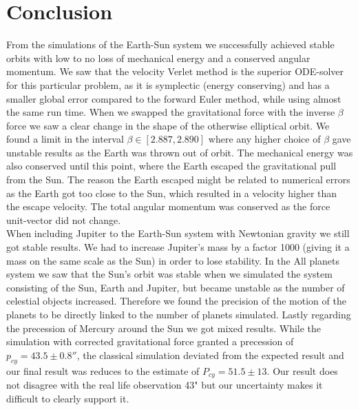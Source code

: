 \documentclass[american,a4paper,12pt]{article}
\begin{document}
\section{Conclusion}
From the simulations of the Earth-Sun system we successfully achieved stable orbits with low to no loss of mechanical energy and a conserved angular momentum. We saw that the velocity Verlet method is the superior ODE-solver for this particular problem, as it is symplectic (energy conserving) and has a smaller global error compared to the forward Euler method, while using almost the same run time. When we swapped the gravitational force with the inverse $\beta$ force we saw a clear change in the shape of the otherwise elliptical orbit. We found a limit in the interval $\beta \in [2.887, 2.890]$ where any higher choice of $\beta$ gave unstable results as the Earth was thrown out of orbit. The mechanical energy was also conserved until this point, where the Earth escaped the gravitational pull from the Sun. The reason the Earth escaped might be related to numerical errors as the Earth got too close to the Sun, which resulted in a velocity higher than the escape velocity. The total angular momentum was conserved as the force unit-vector did not change. \\When including Jupiter to the Earth-Sun system with Newtonian gravity we still got stable results. We had to increase Jupiter's mass by a factor 1000 (giving it a mass on the same scale as the Sun) in order to lose stability. In the All planets system we saw that the Sun's orbit was stable when we simulated the system consisting of the Sun, Earth and Jupiter, but became unstable as the number of celestial objects increased. Therefore we found the precision of the motion of the planets to be directly linked to the number of planets simulated. Lastly regarding the precession of Mercury around the Sun we got mixed results. While the simulation with corrected gravitational force granted a precession of $p_{cy} = 43.5 \pm 0.8 ''$, the classical simulation deviated from the expected result and our final result was reduces to the estimate of $P_{cy} = 51.5 \pm 13$. Our result does not disagree with the real life observation 43" but our uncertainty makes it difficult to clearly support it. 
\end{document}
